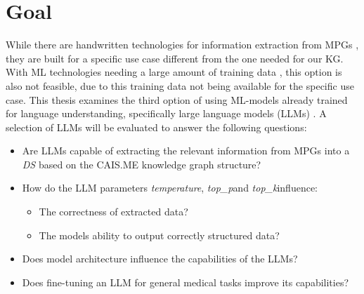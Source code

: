 \documentclass[bs, english]{stthesis}
\newcommand{\temperature}{{\textit{temperature}}}
\newcommand{\topP}{{\textit{top\_p}}}
\newcommand{\topK}{{\textit{top\_k}}}
\begin{document}

\section{Goal}

While there are handwritten technologies for information extraction from MPGs \cite{kaiserGainingProcessInformation2005}, they are built for a specific use case different from the one needed for our KG. With ML technologies needing a large amount of training data \cite{grishman1997information}, this option is also not feasible, due to this training data not being available for the specific use case. This thesis examines the third option of using ML-models already trained for language understanding, specifically large language models (LLMs) \cite{wangHistoryDevelopmentPrinciples2025}. A selection of LLMs will be evaluated to answer the following questions:
\begin{itemize}
  \item Are LLMs capable of extracting the relevant information from MPGs into a \textit{DS} based on the CAIS.ME knowledge graph structure?
  \item How do the LLM parameters \temperature, \topP and \topK influence:
    \begin{itemize}
      \item The correctness of extracted data?
      \item The models ability to output correctly structured data?
    \end{itemize}
  \item Does model architecture influence the capabilities of the LLMs?
  \item Does fine-tuning an LLM for general medical tasks improve its capabilities?
\end{itemize}
\end{document}
